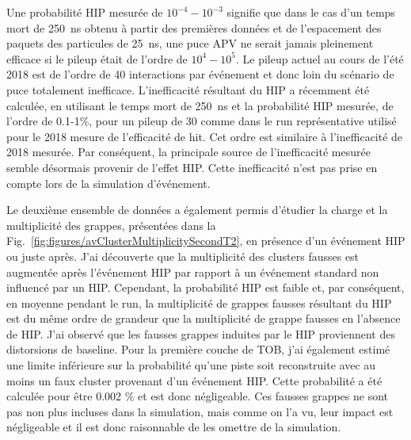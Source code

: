 Une probabilité HIP mesurée de $10^{-4}-10^{-3}$ signifie que dans le cas d'un temps mort de 250~ns obtenu à partir des premières données et de l'espacement des paquets des particules de 25~ns, une puce APV ne serait jamais pleinement efficace si le pileup était de l'ordre de $10^4 - 10^5$. Le pileup actuel au cours de l'été 2018 est de l'ordre de 40 interactions par événement et donc loin du scénario de puce totalement inefficace. L'inefficacité résultant du HIP a récemment été calculée, en utilisant le temps mort de 250~ns et la probabilité HIP mesurée, de l'ordre de 0.1-1\%, pour un pileup de 30 comme dans le run représentative utilisé pour le 2018 mesure de l'efficacité de hit. Cet ordre est similaire à l'inefficacité de 2018 mesurée. Par conséquent, la principale source de l’inefficacité mesurée semble désormais provenir de l’effet HIP. Cette inefficacité n'est pas prise en compte lors de la simulation d'événement.


Le deuxième ensemble de données a également permis d'étudier la charge et la multiplicité des grappes, présentées dans la Fig.~\ref{fig:figures/avClusterMultiplicitySecondT2}, en présence d'un événement HIP ou juste après. J'ai découverte que la multiplicité des clusters fausses est augmentée après l'événement HIP par rapport à un événement standard non influencé par un HIP. Cependant, la probabilité HIP est faible et, par conséquent, en moyenne pendant le run, la multiplicité de grappes fausses résultant du HIP est du même ordre de grandeur que la multiplicité de grappe fausses en l'absence de HIP. J'ai observé que les fausses grappes induites par le HIP proviennent des distorsions de baseline. Pour la première couche de TOB, j'ai également estimé une limite inférieure sur la probabilité qu'une piste soit reconstruite avec au moins un faux cluster provenant d'un événement HIP. Cette probabilité a été calculée pour être 0.002 \% et est donc négligeable. Ces fausses grappes ne sont pas non plus incluses dans la simulation, mais comme on l’a vu, leur impact est négligeable et il est donc raisonnable de les omettre de la simulation.


